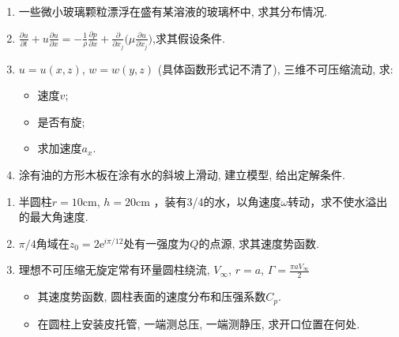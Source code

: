 \newpage



\begin{enumerate}
\item 一些微小玻璃颗粒漂浮在盛有某溶液的玻璃杯中, 求其分布情况.
\item $\displaystyle \frac{\partial u}{\partial t} + u \frac{\partial u}{\partial x} 
= -\frac{1}{\rho}\frac{\partial p}{\partial x} + \frac{\partial}{\partial x_j} \bigg(\mu \frac{\partial u}{\partial x_j}\bigg)$,求其假设条件.

\item $u=u(x,z)$, $w=w(y,z)$ (具体函数形式记不清了), 三维不可压缩流动, 求: 
      \begin{itemize}
      \item 速度$v$;
      \item 是否有旋; 
      \item 求加速度$a_x$.
      \end{itemize}
\item 涂有油的方形木板在涂有水的斜坡上滑动, 建立模型, 给出定解条件.
\end{enumerate}


\begin{enumerate}
\item 半圆柱$r = 10\textrm{cm}$, $h=20\textrm{cm}$ ，装有3/4的水，以角速度$\omega$转动，求不使水溢出的最大角速度.
\item $\pi/4$角域在$z_0=2\mathrm{e}^{i\pi/12}$处有一强度为$Q$的点源, 求其速度势函数.
\item 理想不可压缩无旋定常有环量圆柱绕流, $V_\infty$, $r=a$, $\Gamma=\frac{\pi a V_\infty}{2}$
      \begin{itemize}
      \item 其速度势函数, 圆柱表面的速度分布和压强系数$C_p$.
      \item 在圆柱上安装皮托管, 一端测总压, 一端测静压, 求开口位置在何处.
      \end{itemize}
\end{enumerate}
